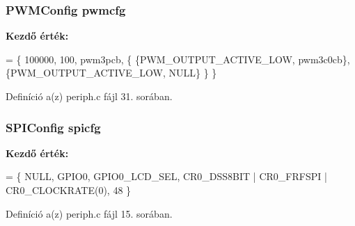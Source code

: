 \subsubsection[{pwmcfg}]{\setlength{\rightskip}{0pt plus 5cm}P\-W\-M\-Config pwmcfg}\label{periph_8c_a902ad52cd507aae1615bd2858a47020d}
{\bfseries Kezdő érték\-:}
\begin{DoxyCode}
= \{
    100000,                          
       100,                          
    pwm3pcb,                         
    \{
        \{PWM\_OUTPUT\_ACTIVE\_LOW, pwm3c0cb\},
        \{PWM\_OUTPUT\_ACTIVE\_LOW, NULL\}
    \}
\}
\end{DoxyCode}


Definíció a(z) periph.\-c fájl 31. sorában.

\subsubsection[{spicfg}]{\setlength{\rightskip}{0pt plus 5cm}S\-P\-I\-Config spicfg}\label{periph_8c_afc4986c4ff59c9cd490bd7fd437f7c1a}
{\bfseries Kezdő érték\-:}
\begin{DoxyCode}
= \{
  NULL,
  GPIO0,
  GPIO0\_LCD\_SEL, 
  CR0\_DSS8BIT | CR0\_FRFSPI | CR0\_CLOCKRATE(0),
  48
\}
\end{DoxyCode}


Definíció a(z) periph.\-c fájl 15. sorában.

